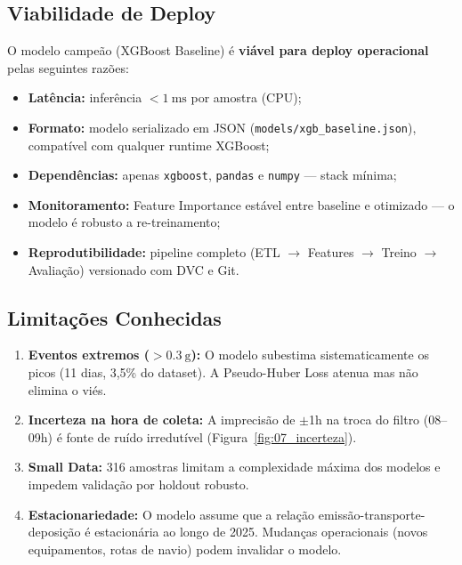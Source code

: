 \documentclass[12pt, a4paper]{article}
\newcommand{\arquivo}[1]{\texttt{#1}}
\begin{document}
\subsection{Viabilidade de Deploy}

O modelo campeão (XGBoost Baseline) é \textbf{viável para deploy
operacional} pelas seguintes razões:

\begin{itemize}[noitemsep]
    \item \textbf{Latência:} inferência $< \SI{1}{\milli\second}$
          por amostra (CPU);
    \item \textbf{Formato:} modelo serializado em JSON
          (\arquivo{models/xgb\_baseline.json}), compatível com
          qualquer runtime XGBoost;
    \item \textbf{Dependências:} apenas \texttt{xgboost},
          \texttt{pandas} e \texttt{numpy} --- stack mínima;
    \item \textbf{Monitoramento:} Feature Importance estável entre
          baseline e otimizado --- o modelo é robusto a re-treinamento;
    \item \textbf{Reprodutibilidade:} pipeline completo
          (ETL $\to$ Features $\to$ Treino $\to$ Avaliação) versionado
          com DVC e Git.
\end{itemize}

\subsection{Limitações Conhecidas}

\begin{enumerate}
    \item \textbf{Eventos extremos ($> \SI{0,3}{\gram}$):} O modelo
          subestima sistematicamente os picos (11 dias, 3,5\% do
          dataset). A Pseudo-Huber Loss atenua mas não elimina o viés.

    \item \textbf{Incerteza na hora de coleta:} A imprecisão de
          $\pm$1h na troca do filtro (08--09h) é fonte de ruído
          irredutível (Figura~\ref{fig:07_incerteza}).

    \item \textbf{Small Data:} 316 amostras limitam a complexidade
          máxima dos modelos e impedem validação por holdout robusto.

    \item \textbf{Estacionariedade:} O modelo assume que a relação
          emissão-transporte-deposição é estacionária ao longo de 2025.
          Mudanças operacionais (novos equipamentos, rotas de navio)
          podem invalidar o modelo.
\end{enumerate}
\end{document}
